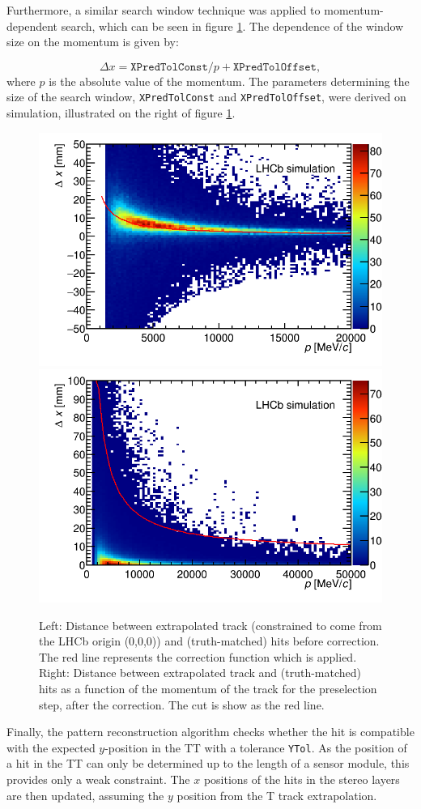 Furthermore, a similar search window technique was applied to momentum-dependent search, which can be seen in figure  \ref{fig:preselWindow}. The
dependence of the window size on the momentum is given by:

\begin{equation}
\Delta x = \texttt{XPredTolConst} / p + \texttt{XPredTolOffset},
\end{equation}
where $p$ is the absolute value of the momentum. The parameters determining the
size of the search window, \texttt{XPredTolConst} and
\texttt{XPredTolOffset}, were derived on simulation, illustrated on the right of
figure \ref{fig:preselWindow}.

\begin{figure}[!htbp]
 \begin{center}
  \includegraphics[width=0.49\linewidth]{figures/xPosCorrection1.png}
   \includegraphics[width=0.49\linewidth]{figures/preselWindow1.png}
   \caption{Left: Distance between extrapolated track (constrained to come from the LHCb origin (0,0,0)) and (truth-matched) hits
   before correction. The red line represents the correction function which is
   applied. Right: Distance between extrapolated track and (truth-matched) hits
   as a function of the momentum of the track for the preselection step, after
   the correction. The cut is show as the red line.
     \label{fig:preselWindow}}
 \end{center}
\end{figure}


Finally, the pattern reconstruction algorithm checks whether the hit is compatible with the expected $y$-position in the TT with a tolerance \texttt{YTol}. As the position of a hit in the TT can only be determined up to
the length of a sensor module, this provides only a weak constraint. The $x$
positions of the hits in the stereo layers are then updated, assuming the $y$ position from the T track extrapolation.

